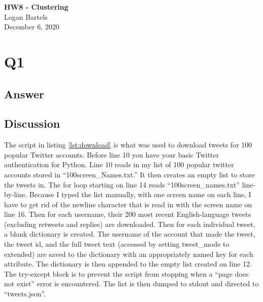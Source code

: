 \documentclass[12pt]{article}
\begin{document}
\begin{centering}
{\large\textbf{HW8 - Clustering}}\\ %
Logan Bartels\\                     %
December 6, 2020\\                      %
\end{centering}



\section*{Q1}

\subsection*{Answer}




\subsection*{Discussion}
The script in listing \ref{lst:download} is what was used to download tweets for 100 popular Twitter accounts.  Before line 10 you have your basic Twitter authentication for Python.  Line 10 reads in my list of 100 popular twitter accounts stored in ``100screen\_Names.txt.''  It then creates an empty list to store the tweets in.  The for loop starting on line 14 reads ``100screen\_names.txt'' line-by-line.  Because I typed the list manually, with one screen name on each line, I have to get rid of the newline character that is read in with the screen name on line 16.  Then for each username, their 200 most recent English-language tweets (excluding retweets and replies) are downloaded.  Then for each individual tweet, a blank dictionary is created.  The username of the account that made the tweet, the tweet id, and the full tweet text (accessed by setting tweet\_mode to extended) are saved to the dictionary with an appropriately named key for each attribute.  The dictionary is then appended to the empty list created on line 12.  The try-except block is to prevent the script from stopping when a ``page does not exist'' error is encountered.  The list is then dumped to stdout and directed to ``tweets.json''.
\end{document}
